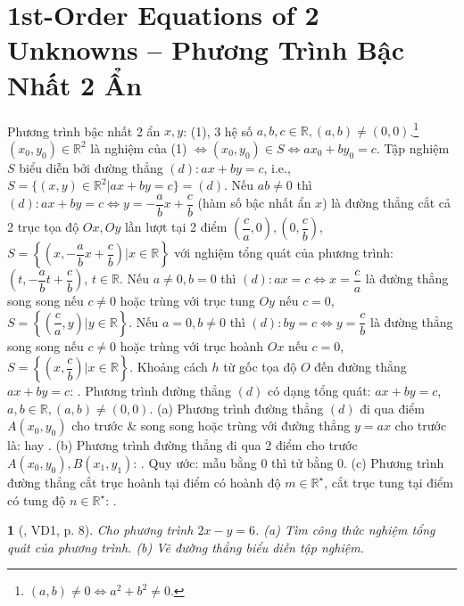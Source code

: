 \documentclass{article}
\newtheorem{baitoan}{}
\begin{document}
\section{1st-Order Equations of 2 Unknowns -- Phương Trình Bậc Nhất 2 Ẩn}
 Phương trình bậc nhất 2 ẩn $x,y$:  (1), 3 hệ số $a,b,c\in\mathbb{R},(a,b)\ne(0,0)$.\footnote{$(a,b)\ne0\Leftrightarrow a^2 + b^2\ne0$.}  $(x_0,y_0)\in\mathbb{R}^2$ là nghiệm của (1) $\Leftrightarrow(x_0,y_0)\in S\Leftrightarrow ax_0 + by_0 = c$.  Tập nghiệm $S$ biểu diễn bởi đường thẳng $(d):ax + by = c$, i.e., $S = \{(x,y)\in\mathbb{R}^2|ax + by = c\} = (d)$.  Nếu $ab\ne0$ thì $(d):ax + by = c\Leftrightarrow y = -\dfrac{a}{b}x + \dfrac{c}{b}$ (hàm số bậc nhất ẩn $x$) là đường thẳng cắt cả 2 trục tọa độ $Ox,Oy$ lần lượt tại 2 điểm $\left(\dfrac{c}{a},0\right),\left(0,\dfrac{c}{b}\right)$, $S = \left\{\left(x,-\dfrac{a}{b}x + \dfrac{c}{b}\right)|x\in\mathbb{R}\right\}$ với nghiệm tổng quát của phương trình: $\left(t,-\dfrac{a}{b}t + \dfrac{c}{b}\right)$, $t\in\mathbb{R}$.  Nếu $a\ne0,b = 0$ thì $(d):ax = c\Leftrightarrow x = \dfrac{c}{a}$ là đường thẳng song song nếu $c\ne0$ hoặc trùng với trục tung $Oy$ nếu $c = 0$, $S = \left\{\left(\dfrac{c}{a},y\right)|y\in\mathbb{R}\right\}$.  Nếu $a = 0,b\ne0$ thì $(d):by = c\Leftrightarrow y = \dfrac{c}{b}$ là đường thẳng song song nếu $c\ne0$ hoặc trùng với trục hoành $Ox$ nếu $c = 0$, $S = \left\{\left(x,\dfrac{c}{b}\right)|x\in\mathbb{R}\right\}$.  Khoảng cách $h$ từ gốc tọa độ $O$ đến đường thẳng $ax + by = c$: .  Phương trình đường thẳng $(d)$ có dạng tổng quát: $ax + by = c$, $a,b\in\mathbb{R},(a,b)\ne(0,0)$. (a) Phương trình đường thẳng $(d)$ đi qua điểm $A(x_0,y_0)$ cho trước \& song song hoặc trùng với đường thẳng $y = ax$ cho trước là:  hay . (b) Phương trình đường thẳng đi qua 2 điểm cho trước $A(x_0,y_0),B(x_1,y_1)$: . Quy ước: mẫu bằng $0$ thì tử bằng $0$. (c) Phương trình đường thẳng cắt trục hoành tại điểm có hoành độ $m\in\mathbb{R}^\star$, cắt trục tung tại điểm có tung độ $n\in\mathbb{R}^\star$: .

\begin{baitoan}[\cite{Binh_boi_duong_Toan_9_tap_2}, VD1, p. 8]
	Cho phương trình $2x - y = 6$. (a) Tìm công thức nghiệm tổng quát của phương trình. (b) Vẽ đường thẳng biểu diễn tập nghiệm.
\end{baitoan}
\end{document}
